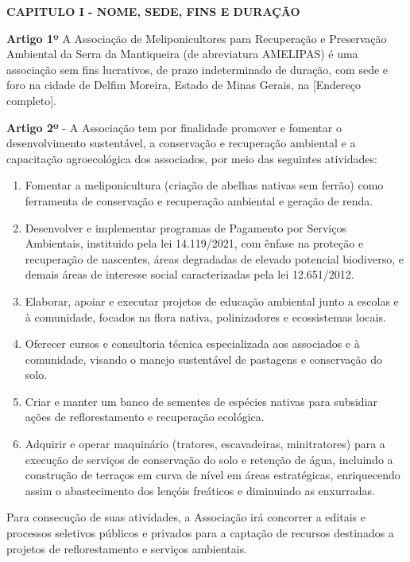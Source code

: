 \documentclass[12pt]{article}
\newcommand{\capitulo}[1]{\begin{center}\fontseries{b}\selectfont\textbf{\MakeUppercase{#1}}\end{center}}
\newcommand{\artigo}[1]{\vspace{1.0em}\noindent\textbf{#1}}
\newcommand{\paragrafo}[1]{\vspace{1.0em}\noindent{#1}}
\newcommand{\titulo}[1]{\begin{center}\fontsize{18}{22}\fontseries{b}\selectfont{#1\\[1.0em]}\end{center}}
\newcommand{\subtitulo}[1]{\begin{center}\fontsize{16}{17}\fontseries{m}\selectfont{#1\\[0.5em]}\end{center}}
\newcommand{\subsubtitulo}[1]{\begin{center}\fontsize{10}{12}\fontseries{m}\selectfont{#1\\[3.0em]}\end{center}}
\begin{document}
\titulo{ESTATUTO SOCIAL}
\subtitulo{Associação de Meliponicultores para Recuperação \\e Preservação Ambiental da Serra da Mantiqueira}\subsubtitulo{CNPJ 12.3456.789/0001-00}


\capitulo{Capitulo I - Nome, Sede, Fins e Duração}

\artigo{Artigo 1º} A Associação de Meliponicultores para Recuperação e Preservação Ambiental da Serra da Mantiqueira (de abreviatura AMELIPAS) é uma associação sem fins lucrativos, de prazo indeterminado de duração, com sede e foro na cidade de Delfim Moreira, Estado de Minas Gerais, na [Endereço completo].

\artigo{Artigo 2º} - A Associação tem por finalidade promover e fomentar o desenvolvimento sustentável, a conservação e recuperação ambiental e a capacitação agroecológica dos associados, por meio das seguintes atividades:
\begin{enumerate}[label=\alph*)]
  \item Fomentar a meliponicultura (criação de abelhas nativas sem ferrão) como ferramenta de conservação e recuperação ambiental e geração de renda.
  \item Desenvolver e implementar programas de Pagamento por Serviços Ambientais, instituido pela lei 14.119/2021, com ênfase na proteção e recuperação de nascentes, áreas degradadas de elevado potencial biodiverso, e demais áreas de interesse social caracterizadas pela lei 12.651/2012.
  \item Elaborar, apoiar e executar projetos de educação ambiental junto a escolas e à comunidade, focados na flora nativa, polinizadores e ecossistemas locais.
  \item Oferecer cursos e consultoria técnica especializada aos associados e à comunidade, visando o manejo sustentável de pastagens e conservação do solo.
  \item Criar e manter um banco de sementes de espécies nativas para subsidiar ações de reflorestamento e recuperação ecológica.
  \item Adquirir e operar maquinário (tratores, escavadeiras, minitratores) para a execução de serviços de conservação do solo e retenção de água, incluindo a construção de terraços em curva de nível em áreas estratégicas, enriquecendo assim o abastecimento dos lençóis freáticos e diminuindo as enxurradas.
\end{enumerate}

\paragrafo{§ PRIMEIRO} Para consecução de suas atividades, a Associação irá concorrer a editais e processos seletivos públicos e privados para a captação de recursos destinados a projetos de reflorestamento e serviços ambientais.
\end{document}
